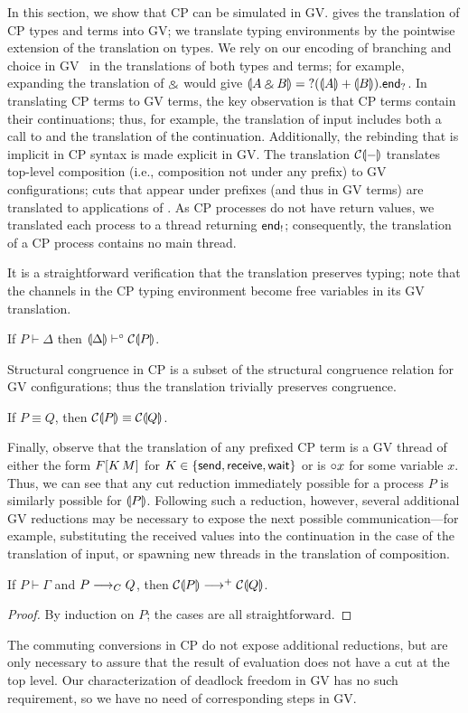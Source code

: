 \documentclass[orivec,envcountsame]{llncs}
\begin{document}
In this section, we show that CP can be simulated in GV.   gives the translation of
CP types and terms into GV; we translate typing environments by the pointwise extension of the
translation on types.  We rely on our encoding of branching and choice in GV~ in
the translations of both types and terms; for example, expanding the translation of $\mathbin\binampersand$ would
give $\llparenthesis A \mathbin\binampersand B \rrparenthesis = {?(\llparenthesis A \rrparenthesis + \llparenthesis B \rrparenthesis).\mathsf{end}_?}$. In translating CP terms to GV
terms, the key observation is that CP terms contain their continuations; thus, for example, the
translation of input includes both a call to  and the translation of the
continuation.  Additionally, the rebinding that is implicit in CP syntax is made explicit in GV.
The translation $\mathcal{C}\llparenthesis - \rrparenthesis$ translates top-level composition (i.e., composition not under any
prefix) to GV configurations; cuts that appear under prefixes (and thus in GV terms) are translated
to applications of .  As CP processes do not have return values, we translated each
process to a thread returning $\mathsf{end}_!$; consequently, the translation of a CP process contains no
main thread.

It is a straightforward verification that the translation preserves typing; note that the channels
in the CP typing environment become free variables in its GV translation.
%
\begin{theorem}
If $P \vdash \Delta$ then $\llparenthesis \Delta \rrparenthesis \vdash^{\mathord{\circ}} \mathcal{C}\llparenthesis P \rrparenthesis$.
\end{theorem}
%
Structural congruence in CP is a subset of the structural congruence relation for GV configurations;
thus the translation trivially preserves congruence.
%
\begin{theorem}
If $P \equiv Q$, then $\mathcal{C}\llparenthesis P \rrparenthesis \equiv \mathcal{C}\llparenthesis Q \rrparenthesis$.
\end{theorem}
%
Finally, observe that the translation of any prefixed CP term is a GV thread of either the form $F[K
\, M]$ for $K \in \{ \mathsf{send}, \mathsf{receive}, \mathsf{wait} \}$ or is ${\mathord{\circ}} x$ for
some variable $x$.  Thus, we can see that any cut reduction immediately possible for a process $P$
is similarly possible for $\llparenthesis P \rrparenthesis$.  Following such a reduction, however, several additional GV
reductions may be necessary to expose the next possible communication---for example, substituting
the received values into the continuation in the case of the translation of input, or spawning new
threads in the translation of composition.
%
\begin{theorem}\label{thm:cp-reduction-simulated}
If $P \vdash \Gamma$ and $P \longrightarrow_C Q$, then $\mathcal{C}\llparenthesis P \rrparenthesis \longrightarrow^+ \mathcal{C}\llparenthesis Q \rrparenthesis$.
\end{theorem}
%
\begin{proof}
  By induction on $P$; the cases are all straightforward.
\end{proof}
%
The commuting conversions in CP do not expose additional reductions, but are only necessary to
assure that the result of evaluation does not have a cut at the top level.  Our characterization of
deadlock freedom in GV has no such requirement, so we have no need of corresponding steps in GV.
\end{document}
